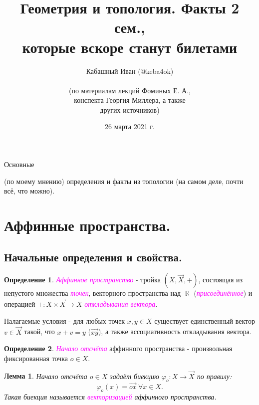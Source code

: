 \documentclass[a4paper,100pt]{article}
\title{Геометрия и топология. Факты 2 сем., \\ которые вскоре станут билетами}
\author{Кабашный Иван (@keba4ok)\\ \\ (по материалам лекций Фоминых Е. А.,\\ конспекта Георгия Миллера, а также \\ других источников)}
\date{26 марта 2021 г.}
\theoremstyle{indented}
\newtheorem{lemma}{Лемма}
\theoremstyle{definition}
\newtheorem{defn}{Определение}
\theoremstyle{remark}
\DeclareMathOperator{\ra}{\rightarrow}
\DeclareMathOperator{\RR}{\mathbb{R}}
\begin{document}
\newcommand{\resetexlcounters}{%
  \setcounter{exl}{0}%
} 

\newcommand{\resetremarkcounters}{%
  \setcounter{remark}{0}%
} 

\newcommand{\reseconscounters}{%
  \setcounter{cons}{0}%
} 

\newcommand{\resetall}{%
    \resetexlcounters
    \resetremarkcounters
    \reseconscounters%
}

\maketitle 

\newpage

\hypertarget{t1}{Основные} (по моему мнению) определения и факты из топологии (на самом деле, почти всё, что можно).
\tableofcontents

\newpage


\section{Аффинные пространства.}

\subsection{Начальные определения и свойства.}

\begin{defn}
    \textit{\textcolor{magenta}{\hypertarget{s1}{Аффинное пространство}}} - тройка $(X, \vec{X}, +)$, состоящая из непустого множества \textit{\textcolor{magenta}{\hypertarget{s2}{точек}}}, векторного пространства над $\RR$ (\textit{\textcolor{magenta}{\hypertarget{s3}{присоединённое}}}) и операцией $+:X\times \vec{X}\ra X$ \textit{\textcolor{magenta}{\hypertarget{s4}{откладывания вектора}}}. \ 

    Налагаемые условия - для любых точек $x, y\in X$ существует единственный вектор $v\in \vec{X}$ такой, что $x+v=y$ ($\vec{xy}$), а также ассоциативность откладывания вектора.
\end{defn}

\begin{defn}
    \textit{\textcolor{magenta}{\hypertarget{s5}{Начало отсчёта}}} аффинного пространства - произвольная фиксированная точка $o\in X$. 
\end{defn}

\begin{lemma}
    Начало отсчёта $o\in X$ задаёт биекцию $\varphi_o: X\ra \vec{X}$ по правилу:
    \[
        \varphi_o(x)=\vec{ox} \: \forall x \in X. 
    \]
    Такая биекция называется \textit{\textcolor{magenta}{\hypertarget{s6}{векторизацией}}} аффинного пространства.
\end{lemma}
\end{document}

